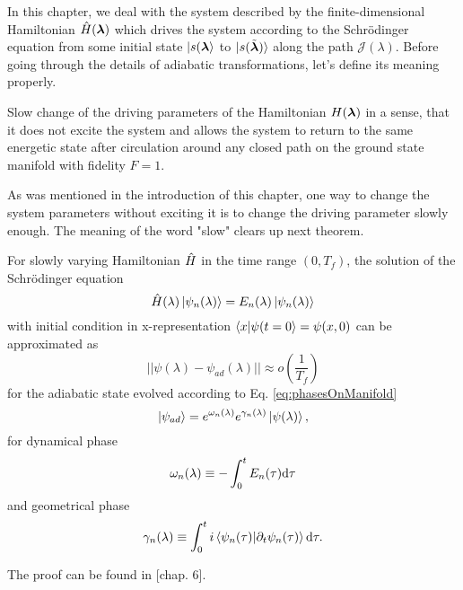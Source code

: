 In this chapter, we deal with the system described by the finite-dimensional Hamiltonian $\hat{H}({\bm\lambda})$ which drives the system according to the Schr\"odinger equation from some initial state $\ket{s({\bm\lambda}}$ to $\ket{s(\tilde{{\bm\lambda}})}$ along the path $\mathcal J(\lambda)$. Before going through the details of adiabatic transformations, let's define its meaning properly.

\begin{definition}[Adibaticity]
    Slow change of the driving parameters of the Hamiltonian $H({\bm\lambda})$ in a sense, that it does not excite the system and allows the system to return to the same energetic state after circulation around any closed path on the ground state manifold with fidelity $F=1$. 
\end{definition}


As was mentioned in the introduction of this chapter, one way to change the system parameters without exciting it is to change the driving parameter slowly enough. The meaning of the word "slow" clears up next theorem.
\begin{thm}
    \label{adiabaticTheorem}
    For slowly varying Hamiltonian $\hat{H}$ in the time range $(0,T_f)$, the solution of the Schrödinger equation 
    $$\hat{H}(\lambda)\ket{\psi_n(\lambda)} = E_n(\lambda)\ket{\psi_n(\lambda)}$$
    with initial condition in x-representation $\braket{x|\psi(t=0}=\psi(x,0)$ can be approximated as
    \begin{equation}
      ||\psi(\lambda) - \psi_{ad}(\lambda)||\approx o\left(\frac{1}{T_f}\right)
    \end{equation}
    for the adiabatic state evolved according to Eq. \ref{eq:phasesOnManifold}
    \begin{equation}
        \ket{\psi_{ad}}= e^{\omega_n(\lambda)}e^{\gamma_n(\lambda)}\ket{\psi(\lambda)},
    \end{equation}
    for dynamical phase
    $$\omega_n(\lambda)\equiv -\int_0^t E_n(\tau)\mathrm{d} \tau$$
    and geometrical phase
        $$\gamma_n(\lambda)\equiv \int_0^t i\braket{\psi_n(\tau)|\partial_t\psi_n(\tau)} \mathrm{d} \tau .$$
\end{thm}
\begin{myproof}
    The proof can be found in \cite{sakurai}[chap. 6].
\end{myproof}














